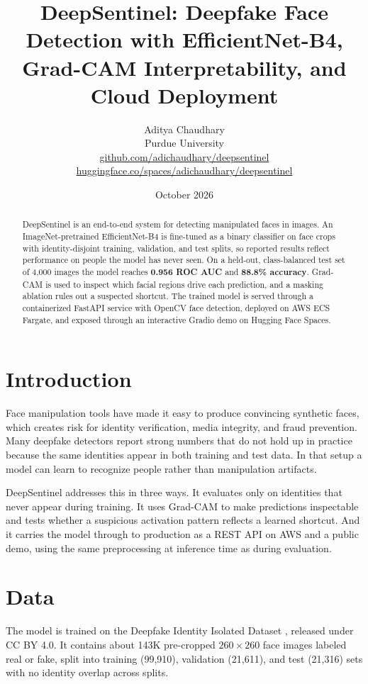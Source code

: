 \documentclass[11pt]{article}
\title{\textbf{DeepSentinel: Deepfake Face Detection with EfficientNet-B4,\\Grad-CAM Interpretability, and Cloud Deployment}}
\author{Aditya Chaudhary\\[2pt]
\small Purdue University\\
\small \href{https://github.com/adichaudhary/deepsentinel}{github.com/adichaudhary/deepsentinel}
\quad\textbullet\quad
\href{https://huggingface.co/spaces/adichaudhary/deepsentinel}{huggingface.co/spaces/adichaudhary/deepsentinel}}
\date{October 2026}
\begin{document}
\maketitle

\begin{abstract}
\noindent
DeepSentinel is an end-to-end system for detecting manipulated faces in images. An ImageNet-pretrained EfficientNet-B4 is fine-tuned as a binary classifier on face crops with identity-disjoint training, validation, and test splits, so reported results reflect performance on people the model has never seen. On a held-out, class-balanced test set of 4,000 images the model reaches \textbf{0.956 ROC AUC} and \textbf{88.8\% accuracy}. Grad-CAM is used to inspect which facial regions drive each prediction, and a masking ablation rules out a suspected shortcut. The trained model is served through a containerized FastAPI service with OpenCV face detection, deployed on AWS ECS Fargate, and exposed through an interactive Gradio demo on Hugging Face Spaces.
\end{abstract}

\section{Introduction}

Face manipulation tools have made it easy to produce convincing synthetic faces, which creates risk for identity verification, media integrity, and fraud prevention. Many deepfake detectors report strong numbers that do not hold up in practice because the same identities appear in both training and test data. In that setup a model can learn to recognize people rather than manipulation artifacts.

DeepSentinel addresses this in three ways. It evaluates only on identities that never appear during training. It uses Grad-CAM to make predictions inspectable and tests whether a suspicious activation pattern reflects a learned shortcut. And it carries the model through to production as a REST API on AWS and a public demo, using the same preprocessing at inference time as during evaluation.

\section{Data}

The model is trained on the Deepfake Identity Isolated Dataset \cite{dataset}, released under CC BY 4.0. It contains about 143K pre-cropped $260\times260$ face images labeled real or fake, split into training (99,910), validation (21,611), and test (21,316) sets with no identity overlap across splits.
\end{document}
